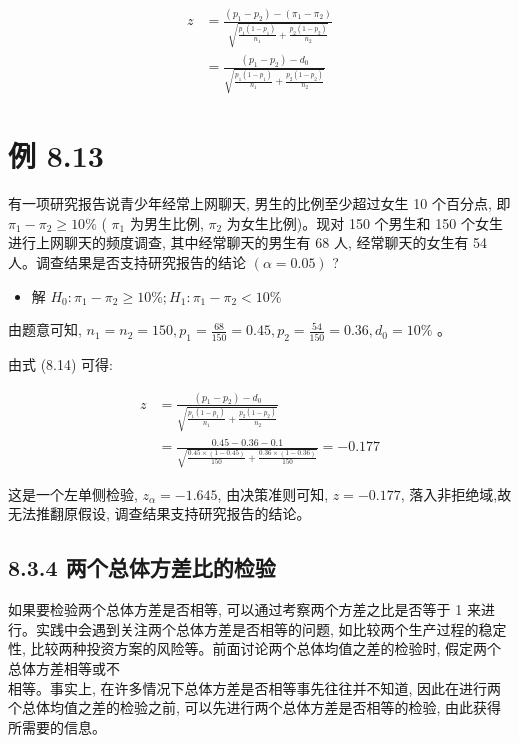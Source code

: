 \documentclass[10pt]{article}
\begin{document}
\begin{CJK*}{UTF8}{bsmi}
\begin{align*}
z & =\frac{\left(p_{1}-p_{2}\right)-\left(\pi_{1}-\pi_{2}\right)}{\sqrt{\frac{p_{1}\left(1-p_{1}\right)}{n_{1}}+\frac{p_{2}\left(1-p_{2}\right)}{n_{2}}}} \\
& =\frac{\left(p_{1}-p_{2}\right)-d_{0}}{\sqrt{\frac{p_{1}\left(1-p_{1}\right)}{n_{1}}+\frac{p_{2}\left(1-p_{2}\right)}{n_{2}}}} \tag{8.14}
\end{align*}


\section*{例 8.13}
有一项研究报告说青少年经常上网聊天, 男生的比例至少超过女生 10 个百分点, 即 $\pi_{1}-\pi_{2} \geqslant 10 \%$ ( $\pi_{1}$ 为男生比例, $\pi_{2}$ 为女生比例)。现对 150 个男生和 150 个女生进行上网聊天的频度调查, 其中经常聊天的男生有 68 人, 经常聊天的女生有 54 人。调查结果是否支持研究报告的结论 $(\alpha=0.05)$ ?

\begin{itemize}
  \item 解 $H_{0}: \pi_{1}-\pi_{2} \geqslant 10 \% ; H_{1}: \pi_{1}-\pi_{2}<10 \%$
\end{itemize}

由题意可知, $n_{1}=n_{2}=150, p_{1}=\frac{68}{150}=0.45, p_{2}=\frac{54}{150}=0.36, d_{0}=10 \%$ 。

由式 (8.14) 可得:

$$
\begin{aligned}
z & =\frac{\left(p_{1}-p_{2}\right)-d_{0}}{\sqrt{\frac{p_{1}\left(1-p_{1}\right)}{n_{1}}+\frac{p_{2}\left(1-p_{2}\right)}{n_{2}}}} \\
& =\frac{0.45-0.36-0.1}{\sqrt{\frac{0.45 \times(1-0.45)}{150}+\frac{0.36 \times(1-0.36)}{150}}}=-0.177
\end{aligned}
$$

这是一个左单侧检验, $z_{\alpha}=-1.645$, 由决策准则可知, $z=-0.177$, 落入非拒绝域,故无法推翻原假设, 调查结果支持研究报告的结论。

\subsection*{8.3.4 两个总体方差比的检验}
如果要检验两个总体方差是否相等, 可以通过考察两个方差之比是否等于 1 来进行。实践中会遇到关注两个总体方差是否相等的问题, 如比较两个生产过程的稳定性, 比较两种投资方案的风险等。前面讨论两个总体均值之差的检验时, 假定两个总体方差相等或不\\
相等。事实上, 在许多情况下总体方差是否相等事先往往并不知道, 因此在进行两个总体均值之差的检验之前, 可以先进行两个总体方差是否相等的检验, 由此获得所需要的信息。


\end{CJK*}
\end{document}
